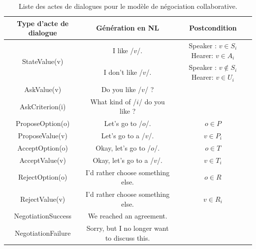 				\begin{table}[p]
				\begin{adjustbox}{angle=90}
					\begin{tabular} {|c|c|c|}
						\hline
						\textbf{Type d'acte de dialogue}  &\textbf{ Génération en NL} & \textbf{Postcondition}\\
						\hline
						\multirow{2}{*}{StateValue(v)} &  I like /$v$/. & Speaker : $v \in S_i$ \newline Hearer:  \newline $v\in A_i$ \\
						
						\cline{2-3} & I don't like /$v$/. & Speaker : $v \notin S_i$ \newline Hearer:  $v\in U_i$ \\
					
						\hline
						AskValue(v)& Do you like /$v$/ ? & \multirow{2}{*}{} \\
						
						AskCriterion(i) &  What kind of /$i$/ do you like ? & \\
						\hline
						ProposeOption(o)  & Let's go to /$o$/. & $o \in P$\\
						
						ProposeValue(v) & Let's go to a /$v$/. & $v \in P_i$\\
						\hline
						AcceptOption(o)& Okay, let's go to /$o$/.& $o \in T$ \\
						
						AcceptValue(v) & Okay, let's go to a /$v$/.& $v \in T_i$ \\
						\hline
						RejectOption(o) & I'd rather choose  something else. & $o \in R$\\
						
						RejectValue(v) &  I'd rather choose  something else. & $v \in R_i$ \\
						\hline
						NegotiationSuccess &  We reached an agreement. & \multirow{2}{*}{}\\
						\cline{1-2}
						NegotiationFailure &  Sorry, but I no longer want to discuss this. & \\
						\hline
					\end{tabular}
					
					\caption{\label{table:utt}Liste des actes de dialogues pour le modèle de négociation collaborative.}
					\end{adjustbox}
				\end{table}
				
